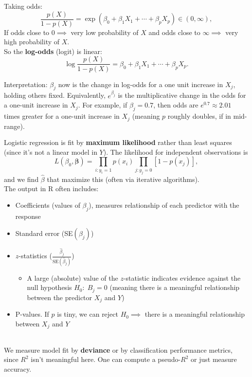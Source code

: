 \documentclass[11pt]{article}
\begin{document}
\noindent Taking odds:
\[ \frac{p(X)}{1-p(X)} = \exp(\beta_0 + \beta_1 X_1 + \cdots + \beta_p X_p) \in (0, \infty), \]
If odds close to $0 \implies $ very low probability of $X$ and odds close to $\infty \implies$ very high probability of $X$. \\
\noindent So the \textbf{log-odds} (logit) is linear:
\[ \log\frac{p(X)}{1-p(X)} = \beta_0 + \beta_1 X_1 + \cdots + \beta_p X_p. \]

\noindent Interpretation: $\beta_j$ now is the change in log-odds for a one unit increase in $X_j$, holding others fixed. Equivalently, $e^{\beta_j}$ is the multiplicative change in the odds for a one-unit increase in $X_j$. For example, if $\beta_j = 0.7$, then odds are $e^{0.7}\approx2.01$ times greater for a one-unit increase in $X_j$ (meaning $p$ roughly doubles, if in mid-range).

\noindent Logistic regression is fit by \textbf{maximum likelihood} rather than least squares (since it's not a linear model in $Y$). The likelihood for independent observations is 
\[ L(\beta_0,\boldsymbol{\beta}) = \prod_{i: y_i=1} p(x_i) \prod_{j: y_j=0} [1-p(x_j)], \]
and we find $\hat\beta$ that maximize this (often via iterative algorithms).  \\

\noindent The output in R often includes:
\begin{itemize}
    \item Coefficients (values of $\beta_j$), measures relationship of each predictor with the response
    \item Standard error (SE$(\beta_j)$)
    \item $z$-statistics ($\frac{\hat{\beta}_j}{\text{SE}(\hat{\beta}_j)}$)
    \begin{itemize}
        \item A large (absolute) value of the $z$-statistic indicates evidence against the null hypothesis $H_0: \; B_j = 0$ (meaning there is a meaningful relationship between the predictor $X_j$ and $Y$)
    \end{itemize}
    \item P-values. If $p$ is tiny, we can reject $H_0 \implies$ there is a meaningful relationship between $X_j$ and $Y$
\end{itemize} 
\phantom{i}
\\ \noindent We measure model fit by \textbf{deviance} or by classification performance metrics, since $R^2$ isn't meaningful here. One can compute a pseudo-$R^2$ or just measure accuracy. \\
\end{document}
